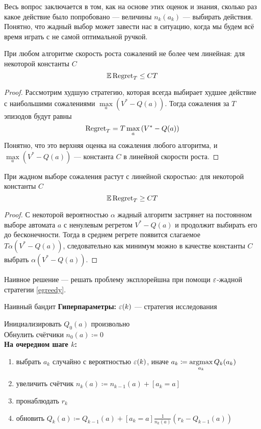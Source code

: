 Весь вопрос заключается в том, как на основе этих оценок и знания, сколько раз какое действие было попробовано --- величины $n_k(a_k)$ --- выбирать действия. Понятно, что жадный выбор может завести нас в ситуацию, когда мы будем всё время играть с не самой оптимальной ручкой.

\begin{proposition}
При любом алгоритме скорость роста сожалений не более чем линейная: для некоторой константы $C$
$$\mathbb{E} \operatorname{Regret}_T \le CT$$
\begin{proof}
Рассмотрим худшую стратегию, которая всегда выбирает худшее действие с наибольшими сожалениями $\max\limits_a \left( V^* - Q(a) \right)$. Тогда сожаления за $T$ эпизодов будут равны
$$\operatorname{Regret}_T = T \max\limits_a \left( V^* - Q(a) \right)$$
Понятно, что это верхняя оценка на сожаления любого алгоритма, и $\max\limits_a \left( V^* - Q(a) \right)$ --- константа $C$ в линейной скорости роста.
\end{proof}
\end{proposition}

\begin{proposition}
При жадном выборе сожаления растут с линейной скоростью: для некоторой константы $C$
$$\mathbb{E} \operatorname{Regret}_T \ge CT$$
\begin{proof}
С некоторой вероятностью $\alpha$ жадный алгоритм застрянет на постоянном выборе автомата $a$ с ненулевым регретом $V^* - Q(a)$ и продолжит выбирать его до бесконечности. Тогда в среднем регрете появится слагаемое $T \alpha (V^* - Q(a))$, следовательно как минимум можно в качестве константы $C$ выбрать $\alpha (V^* - Q(a))$.
\end{proof}
\end{proposition}

Наивное решение --- решать проблему эксплорейшна при помощи $\varepsilon$-жадной стратегии \ref{egreedy}.

\begin{algorithm}{Наивный бандит}
\textbf{Гиперпараметры:} $\varepsilon(k)$ --- стратегия исследования

\vspace{0.3cm}
Инициализировать $Q_0(a)$ произвольно \\
Обнулить счётчики $n_0(a) \coloneqq 0$ \\
\textbf{На очередном шаге $k$:}
\begin{enumerate}
    \item выбрать $a_k$ случайно с вероятностью $\varepsilon(k)$, иначе $a_k \coloneqq \mathop{\mathrm{argmax}}\limits_{a_k} Q_k(a_k)$
    \item увеличить счётчик $n_k(a) \coloneqq n_{k-1}(a) + [a_k = a]$
    \item пронаблюдать $r_k$
    \item обновить $Q_k(a) \coloneqq Q_{k-1}(a) + [a_k = a] \frac{1}{n_k(a)} \left( r_k - Q_{k-1}(a) \right)$
\end{enumerate}
\end{algorithm}

